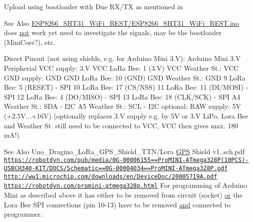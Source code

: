 Upload using bootloader with Due R\-X/\-T\-X as mentioned in \begin{DoxySeeAlso}{See Also}
\hyperlink{ESP8266__SHT31__WiFi__REST_8ino}{E\-S\-P8266\-\_\-\-S\-H\-T31\-\_\-\-Wi\-Fi\-\_\-\-R\-E\-S\-T/\-E\-S\-P8266\-\_\-\-S\-H\-T31\-\_\-\-Wi\-Fi\-\_\-\-R\-E\-S\-T.\-ino} does \hyperlink{iso646_8h_a31739c27bdcfdac9faae7bf7a5df49e4}{not} work yet need to investigate the signals, may be the bootloader (Mini\-Core?), etc.
\end{DoxySeeAlso}
Direct Pinout (not using shields, e.\-g. for Arduino Mini 3.\-V)\-: Arduino Mini 3.\-V Peripherial V\-C\-C supply\-: 3.\-V V\-C\-C Lo\-Ra Bee\-: 1 (3.\-V) V\-C\-C Weather St.\-: V\-C\-C G\-N\-D supply\-: G\-N\-D G\-N\-D Lo\-Ra Bee\-: 10 (G\-N\-D) G\-N\-D Weather St.\-: G\-N\-D 9 Lo\-Ra Bee\-: 5 (R\-E\-S\-E\-T) -\/ S\-P\-I 10 Lo\-Ra Bee\-: 17 (C\-S/\-N\-S\-S) 11 Lo\-Ra Bee\-: 11 (D\-I/\-M\-O\-S\-I) -\/ S\-P\-I 12 Lo\-Ra Bee\-: 4 (D\-O/\-M\-I\-S\-O) -\/ S\-P\-I 13 Lo\-Ra Bee\-: 18 (C\-L\-K/\-S\-C\-K) -\/ S\-P\-I A4 Weather St.\-: S\-D\-A -\/ I2\-C A5 Weather St.\-: S\-C\-L -\/ I2\-C optional\-: R\-A\-W supply\-: 5\-V (+2.5\-V...+16\-V) (optionally replaces 3.\-V supply e.\-g. by 5\-V or 3.\-V Li\-Po, Lora Bee and Weather St. still need to be connected to V\-C\-C, V\-C\-C then gives max. 180 m\-A!) \begin{DoxySeeAlso}{See Also}
Uno\-\_\-\-Dragino\-\_\-\-Lo\-Ra\-\_\-\-G\-P\-S\-\_\-\-Shield\-\_\-\-T\-T\-N/\-Lora \hyperlink{Uno__MultiWii__HardwarePlatform__Test_2def_8h_a36b40d732683cffecbede218f332e321}{G\-P\-S} Shield v1..\-sch.\-pdf  \href{https://robotdyn.com/pub/media/0G-00006155==ProMINI-ATmega328P(10PCS)-USBCH340-KIT/DOCS/Schematic==0G-00004034==ProMINI-ATmega328P.pdf}{\tt https\-://robotdyn.\-com/pub/media/0\-G-\/00006155==\-Pro\-M\-I\-N\-I-\/\-A\-Tmega328\-P(10\-P\-C\-S)-\/\-U\-S\-B\-C\-H340-\/\-K\-I\-T/\-D\-O\-C\-S/\-Schematic==0\-G-\/00004034==\-Pro\-M\-I\-N\-I-\/\-A\-Tmega328\-P.\-pdf}  \href{http://ww1.microchip.com/downloads/en/DeviceDoc/20005719A.pdf}{\tt http\-://ww1.\-microchip.\-com/downloads/en/\-Device\-Doc/20005719\-A.\-pdf}  \href{https://robotdyn.com/promini-atmega328p.html}{\tt https\-://robotdyn.\-com/promini-\/atmega328p.\-html} For programming of Arduino Mini as described above it has either to be removed from circuit (socket) \hyperlink{iso646_8h_a339a611d7f9dc3a59c359f0da7beaf3c}{or} the Lora Bee S\-P\-I connections (pin 10-\/13) have to be removed \hyperlink{iso646_8h_aa3d7d535cf450b91b9cb6d9cee2edbb9}{and} connected to programmer. 
\end{DoxySeeAlso}
